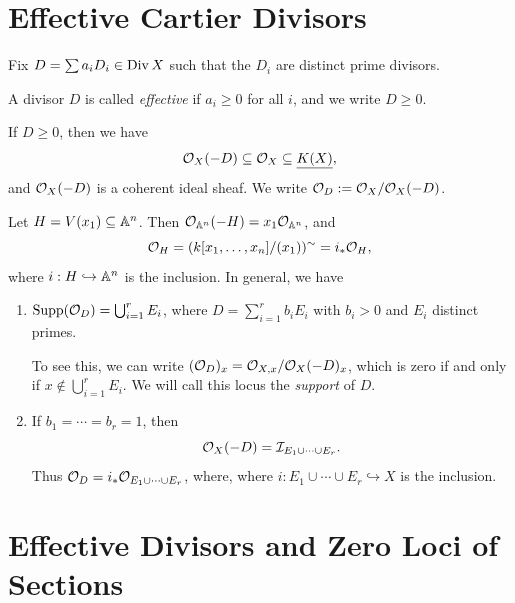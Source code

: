 \section{Effective Cartier Divisors}

\begin{remark}
  Fix $D = \sum a_i D_i \in \operatorname{Div} X$
  such that the $D_i$ are distinct
  prime divisors.
\end{remark}

\begin{definition}
  A divisor $D$ is called \emph{effective}
  if $a_i \ge 0$ for all $i$, and
  we write $D \ge 0$.
\end{definition}

\begin{remark}
  If $D \ge 0$, then we have
  \[
    \mathcal{O}_X(-D)
    \subseteq \mathcal{O}_X
    \subseteq \underline{K(X)},
  \]
  and $\mathcal{O}_X(-D)$ is a coherent ideal
  sheaf. We write
  $\mathcal{O}_D := \mathcal{O}_X / \mathcal{O}_X(-D)$.
\end{remark}

\begin{example}
  Let $H = V(x_1) \subseteq \mathbb{A}^n$.
  Then
  $\mathcal{O}_{\mathbb{A}^n}(-H) = x_1 \mathcal{O}_{\mathbb{A}^n}$,
  and
  \[
    \mathcal{O}_H = (k[x_1, \dots, x_n] / (x_1))^\sim
    = i_* \mathcal{O}_H,
  \]
  where $i : H \hookrightarrow \mathbb{A}^n$
  is the inclusion. In general, we have
  \begin{enumerate}
    \item $\operatorname{Supp}(\mathcal{O}_D) = \bigcup_{i = 1}^r E_i$,
      where $D = \sum_{i = 1}^r b_i E_i$
      with $b_i > 0$ and
      $E_i$ distinct primes.

      To see this, we can write
      $(\mathcal{O}_D)_x = \mathcal{O}_{X, x} / \mathcal{O}_X(-D)_x$,
      which is zero if and only if
      $x \notin \bigcup_{i = 1}^r E_i$.
      We will call this locus the
      \emph{support} of $D$.
    \item If $b_1 = \cdots = b_r = 1$, then
      \[
        \mathcal{O}_X(-D)
        = \mathcal{I}_{E_1 \cup \cdots \cup E_r}.
      \]
      Thus $\mathcal{O}_D = i_* \mathcal{O}_{E_1 \cup \cdots \cup E_r}$, where,
      where $i : E_1 \cup \cdots \cup E_r \hookrightarrow X$ is the inclusion.
  \end{enumerate}
\end{example}

\section{Effective Divisors and Zero Loci of Sections}

